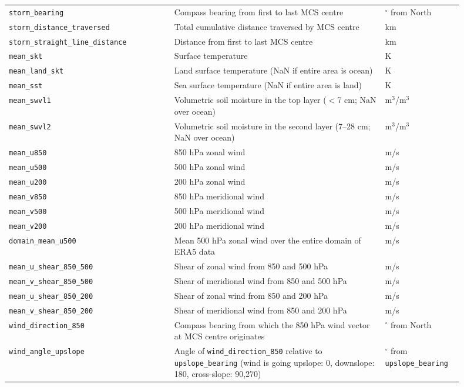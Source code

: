 {\begin{longtable}{>{\raggedright\arraybackslash}p{0.33\linewidth} p{0.42\linewidth} >{\raggedright\arraybackslash}p{0.15\linewidth}}
    \texttt{storm\_bearing} & Compass bearing from first to last MCS centre & $^\circ$ from North \\
    \texttt{storm\_distance\_traversed} & Total cumulative distance traversed by MCS centre & km \\
    \texttt{storm\_straight\_line\_distance} & Distance from first to last MCS centre & km \\
    \texttt{mean\_skt} & Surface temperature & K \\
    \texttt{mean\_land\_skt} & Land surface temperature (NaN if entire area is ocean) & K \\
    \texttt{mean\_sst} & Sea surface temperature (NaN if entire area is land) & K \\
    \texttt{mean\_swvl1} & Volumetric soil moisture in the top layer ($<$7 cm; NaN over ocean) & m$^3$/m$^3$ \\
    \texttt{mean\_swvl2} & Volumetric soil moisture in the second layer (7--28 cm; NaN over ocean) & m$^3$/m$^3$ \\
    \texttt{mean\_u850} & 850 hPa zonal wind & m/s \\
    \texttt{mean\_u500} & 500 hPa zonal wind & m/s \\
    \texttt{mean\_u200} & 200 hPa zonal wind & m/s \\
    \texttt{mean\_v850} & 850 hPa meridional wind & m/s \\
    \texttt{mean\_v500} & 500 hPa meridional wind & m/s \\
    \texttt{mean\_v200} & 200 hPa meridional wind & m/s \\
    \texttt{domain\_mean\_u500} & Mean 500 hPa zonal wind over the entire domain of ERA5 data & m/s \\
    \texttt{mean\_u\_shear\_850\_500} & Shear of zonal wind from 850 and 500 hPa & m/s \\
    \texttt{mean\_v\_shear\_850\_500} & Shear of meridional wind from 850 and 500 hPa & m/s \\
    \texttt{mean\_u\_shear\_850\_200} & Shear of zonal wind from 850 and 200 hPa & m/s \\
    \texttt{mean\_v\_shear\_850\_200} & Shear of meridional wind from 850 and 200 hPa & m/s \\
    \texttt{wind\_direction\_850} & Compass bearing from which the 850 hPa wind vector at MCS centre originates & $^\circ$ from North \\
    \texttt{wind\_angle\_upslope} & Angle of \texttt{wind\_direction\_850} relative to \texttt{upslope\_bearing} (wind is going upslope: 0, downslope: 180, cross-slope: 90,270) & $^\circ$ from \texttt{upslope\_bearing} \\

\end{longtable}}
